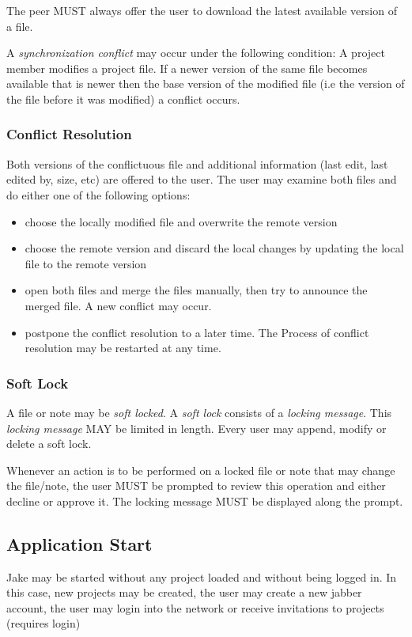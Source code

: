 The peer MUST always offer the user to download the latest available version of a file.

A \emph{synchronization conflict} may occur under the following condition: A project member modifies a project file. If a newer version of the same file becomes available that is newer then the base version of the modified file (i.e the version of the file before it was modified) a conflict occurs.

\subsubsection{Conflict Resolution}
Both versions of the conflictuous file and additional information (last edit, last edited by, size, etc) are offered to the user. The user may examine both files and do either one of the following options:
\begin{itemize}
\item choose the locally modified file and overwrite the remote version
\item choose the remote version and discard the local changes by updating the local file to the remote version
\item open both files and merge the files manually, then try to announce the merged file. A new conflict may occur.
\item postpone the conflict resolution to a later time. The Process of conflict resolution may be restarted at any time.
\end{itemize}

\subsubsection{Soft Lock}
A file or note may be \emph{soft locked}. A \emph{soft lock} consists of a \emph{locking message}. This \emph{locking message} MAY be limited in length. Every user may append, modify or delete a soft lock. 

Whenever an action is to be performed on a locked file or note that may change the file/note, the user MUST be prompted to review this operation and either decline or approve it. The locking message MUST be displayed along the prompt.

\subsection{Application Start}
Jake may be started without any project loaded and without being logged in. In this case, new projects may be created, the user may create a new jabber account, the user may login into the network or receive invitations to projects (requires login)

